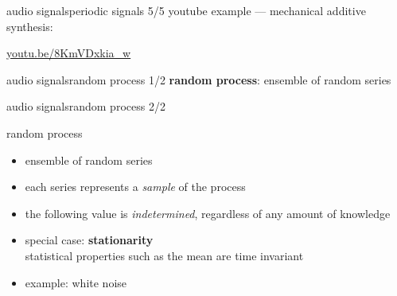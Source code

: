         \begin{frame}{audio signals}{periodic signals 5/5}
            youtube example --- mechanical additive synthesis:
            
            \bigskip
            \bigskip
            \bigskip
            \bigskip
            \begin{center}
                \href{http://youtu.be/8KmVDxkia_w}{youtu.be/8KmVDxkia\_w}
            \end{center}
        \end{frame}

        \begin{frame}{audio signals}{random process 1/2}
            \textbf{random process}: ensemble of random series
        \end{frame}

        \begin{frame}{audio signals}{random process 2/2}
            \begin{block}{random process}
                \begin{itemize}
                    \item   ensemble of random series
                    \item   each series represents a \textit{sample} of the process
                    \item   the following value is \textit{indetermined}, regardless of any amount of knowledge
                \end{itemize}
            \end{block}
            \begin{itemize}
                \item   special case: \textbf{stationarity}\\ statistical properties such as the mean are time invariant
                \item   example: white noise
            \end{itemize}
        \end{frame}

